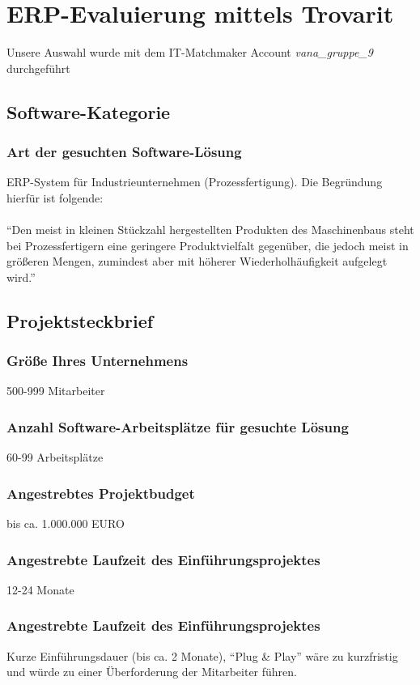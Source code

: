 \section{ERP-Evaluierung mittels Trovarit}
Unsere Auswahl wurde mit dem IT-Matchmaker Account \textit{vana\_gruppe\_9} durchgeführt


\subsection{Software-Kategorie}
\subsubsection{Art der gesuchten Software-Lösung}
\label{sssec_art}
ERP-System für Industrieunternehmen (Prozessfertigung). Die Begründung hierfür ist folgende:\\\\
\enquote{Den meist in kleinen Stückzahl hergestellten Produkten des Maschinenbaus steht bei Prozessfertigern eine geringere Produktvielfalt gegenüber, die jedoch meist in größeren Mengen, zumindest aber mit höherer Wiederholhäufigkeit aufgelegt wird.} \cite{trovarit_prozessfertigung}

\subsection{Projektsteckbrief}
\subsubsection{Größe Ihres Unternehmens}
500-999 Mitarbeiter
\subsubsection{Anzahl Software-Arbeitsplätze für gesuchte Lösung}
60-99 Arbeitsplätze
\subsubsection{Angestrebtes Projektbudget}
bis ca. 1.000.000 EURO
\subsubsection{Angestrebte Laufzeit des Einführungsprojektes}
12-24 Monate
\subsubsection{Angestrebte Laufzeit des Einführungsprojektes}
Kurze Einführungsdauer (bis ca. 2 Monate), \enquote{Plug \& Play} wäre zu kurzfristig und würde zu einer Überforderung der Mitarbeiter führen.
